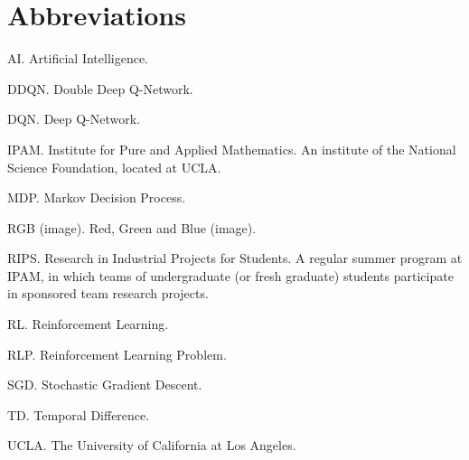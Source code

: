 \chapter{Abbreviations}\label{Abbreviations}

\noindent AI.  Artificial Intelligence.

\vspace{5pt}

\noindent DDQN.  Double Deep Q-Network.

\vspace{5pt}

\noindent DQN.  Deep Q-Network.

\vspace{5pt}

\noindent IPAM. Institute for Pure and Applied Mathematics.  An institute of the National Science  Foundation, located at UCLA.

\vspace{5pt}

\noindent MDP.  Markov Decision Process.

\vspace{5pt}

\noindent RGB (image).  Red, Green and Blue (image).

\vspace{5pt}

\noindent RIPS.  Research in Industrial Projects for Students.  A regular summer program at IPAM, in which teams of undergraduate (or fresh graduate) students participate in sponsored team research projects.

\vspace{5pt}

\noindent RL.  Reinforcement Learning.

\vspace{5pt}

\noindent RLP.  Reinforcement Learning Problem.

\vspace{5pt}

\noindent SGD.  Stochastic Gradient Descent.

\vspace{5pt}

\noindent TD.  Temporal Difference.

\vspace{5pt}

\noindent UCLA.  The University of California at Los Angeles.

\vspace{5pt}


\endinput